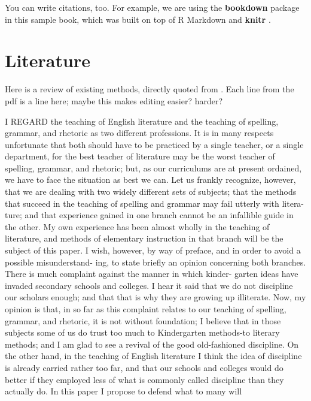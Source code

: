 \documentclass[]{book}
\begin{document}
You can write citations, too. For example, we are using the
\textbf{bookdown} package \citep{R-bookdown} in this sample book, which
was built on top of R Markdown and \textbf{knitr} \citep{xie2015}.

\hypertarget{literature}{%
\chapter{Literature}\label{literature}}

Here is a review of existing methods, directly quoted from
\citep{lewis_method_1903}. Each line from the pdf is a line here; maybe
this makes editing easier? harder?

I REGARD the teaching of English literature and the teaching of
spelling, grammar, and rhetoric as two different professions. It is in
many respects unfortunate that both should have to be practiced by a
single teacher, or a single department, for the best teacher of
literature may be the worst teacher of spelling, grammar, and rhetoric;
but, as our curriculums are at present ordained, we have to face the
situation as best we can. Let us frankly recognize, however, that we are
dealing with two widely different sets of subjects; that the methods
that succeed in the teaching of spelling and grammar may fail utterly
with litera- ture; and that experience gained in one branch cannot be an
infallible guide in the other. My own experience has been almost wholly
in the teaching of literature, and methods of elementary instruction in
that branch will be the subject of this paper. I wish, however, by way
of preface, and in order to avoid a possible misunderstand- ing, to
state briefly an opinion concerning both branches. There is much
complaint against the manner in which kinder- garten ideas have invaded
secondary schools and colleges. I hear it said that we do not discipline
our scholars enough; and that that is why they are growing up
illiterate. Now, my opinion is that, in so far as this complaint relates
to our teaching of spelling, grammar, and rhetoric, it is not without
foundation; I believe that in those subjects some of us do trust too
much to Kindergarten methods-to literary methods; and I am glad to see a
revival of the good old-fashioned discipline. On the other hand, in the
teaching of English literature I think the idea of discipline is already
carried rather too far, and that our schools and colleges would do
better if they employed less of what is commonly called discipline than
they actually do. In this paper I propose to defend what to many will
\end{document}
